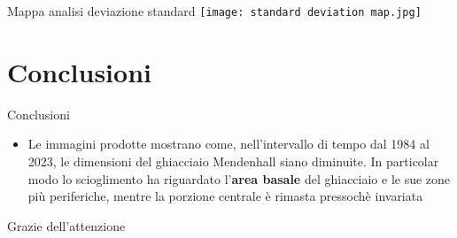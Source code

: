 \documentclass{beamer}
\begin{document}
\begin{frame}{Mappa analisi deviazione standard}
    \texttt{[image: standard deviation map.jpg]}
    \centering
\end{frame}

\section{Conclusioni}

\begin{frame}{Conclusioni}
\begin{itemize}
    \item Le immagini prodotte mostrano come, nell'intervallo di tempo dal 1984 al 2023, le dimensioni del ghiacciaio Mendenhall siano diminuite. In particolar modo lo scioglimento ha riguardato l'\textbf{area basale} del ghiacciaio e le sue zone più periferiche, mentre la porzione centrale è rimasta pressochè invariata
\end{itemize}
\end{frame}

\begin{frame}
\centering
\huge Grazie dell'attenzione
\end{frame}
\end{document}
